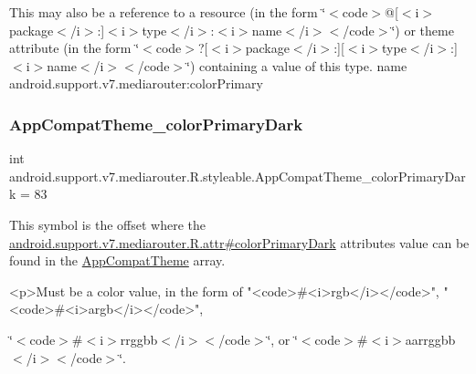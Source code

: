 This may also be a reference to a resource (in the form \char`\"{}$<$code$>$@\mbox{[}$<$i$>$package$<$/i$>$\+:\mbox{]}$<$i$>$type$<$/i$>$\+:$<$i$>$name$<$/i$>$$<$/code$>$\char`\"{}) or theme attribute (in the form \char`\"{}$<$code$>$?\mbox{[}$<$i$>$package$<$/i$>$\+:\mbox{]}\mbox{[}$<$i$>$type$<$/i$>$\+:\mbox{]}$<$i$>$name$<$/i$>$$<$/code$>$\char`\"{}) containing a value of this type.  name android.\+support.\+v7.\+mediarouter\+:color\+Primary \mbox{\label{classandroid_1_1support_1_1v7_1_1mediarouter_1_1R_1_1styleable_a68da362e86b61e6a4cd581ac84979e66}} 
\subsubsection{\texorpdfstring{App\+Compat\+Theme\+\_\+color\+Primary\+Dark}{AppCompatTheme\_colorPrimaryDark}}
{\footnotesize\ttfamily int android.\+support.\+v7.\+mediarouter.\+R.\+styleable.\+App\+Compat\+Theme\+\_\+color\+Primary\+Dark = 83\hspace{0.3cm}{\ttfamily [static]}}

This symbol is the offset where the \hyperlink{classandroid_1_1support_1_1v7_1_1mediarouter_1_1R_1_1attr_a92d196fe27bb6eef459e41535228b2b7}{android.\+support.\+v7.\+mediarouter.\+R.\+attr\#color\+Primary\+Dark} attribute\textquotesingle{}s value can be found in the \hyperlink{classandroid_1_1support_1_1v7_1_1mediarouter_1_1R_1_1styleable_a4e3d3900c75d49aeb2f283cac00214d6}{App\+Compat\+Theme} array.

\begin{DoxyVerb}      <p>Must be a color value, in the form of "<code>#<i>rgb</i></code>", "<code>#<i>argb</i></code>",
\end{DoxyVerb}
 \char`\"{}$<$code$>$\#$<$i$>$rrggbb$<$/i$>$$<$/code$>$\char`\"{}, or \char`\"{}$<$code$>$\#$<$i$>$aarrggbb$<$/i$>$$<$/code$>$\char`\"{}. 

